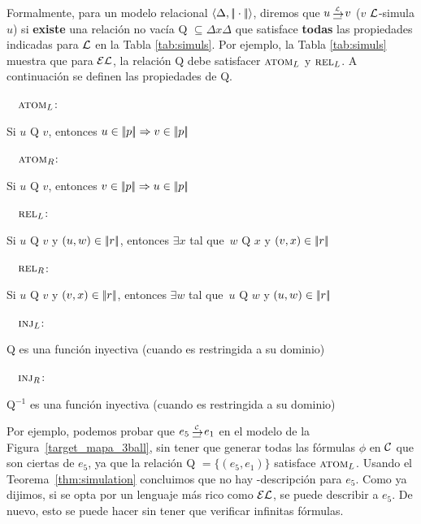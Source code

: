 Formalmente, para un modelo relacional $\langle \Delta, |\!|\cdot|\!| \rangle$, diremos que $u \simul{\+L} v$ ($v$ $\mathcal{L}$-simula $u$) si \textbf{existe} una relaci\'on no vac\'ia Q $\subseteq \Delta x \Delta$ que satisface \textbf{todas} las propiedades indicadas para $\mathcal{L}$ en la Tabla \ref{tab:simuls}. Por ejemplo, la Tabla \ref{tab:simuls} muestra que para $\mathcal{EL}$, la relaci\'on Q debe satisfacer $\textsc{atom}_L$ y $\textsc{rel}_L$. A continuaci\'on se definen las propiedades de Q.
\smallskip 

\newcommand{\simdef}[2]{\noindent\ \ #1\hfill:\ \parbox[t]{.87\textwidth}{#2}\par}

\simdef{$\textsc{atom}_L$}{Si $u$ Q $v$, entonces $u \in |\!|p|\!| \Rightarrow v \in |\!|p|\!|$}
\simdef{$\textsc{atom}_R$}{Si $u$ Q $v$, entonces $v \in |\!|p|\!| \Rightarrow u \in |\!|p|\!|$}
\simdef{$\textsc{rel}_L$}{Si $u$ Q $v$ y $(u,w) \in |\!|r|\!|$, entonces $\exists x$ tal que\ $w$ Q $x$
  y $(v,x) \in |\!|r|\!|$}
\simdef{$\textsc{rel}_R$}{Si $u$ Q $v$ y $(v,x) \in |\!|r|\!|$, entonces $\exists w$ tal que\ $u$ Q $w$ y
 $(u,w) \in |\!|r|\!|$}
\simdef{$\textsc{inj}_L\space$}{Q es una funci\'on inyectiva (cuando es restringida a su dominio)}
\simdef{$\textsc{inj}_R\space$}{Q$^{-1}$ es una funci\'on inyectiva (cuando es restringida a su dominio)}
\smallskip

Por ejemplo, podemos probar que $e_5 \simul{\+C} e_1$ en el modelo de la 
Figura~\ref{target_mapa_3ball}, sin tener que generar todas las f\'ormulas $\phi$ en $\mathcal{C}$ que son ciertas de $e_5$, ya que la relaci\'on Q $= \{(e_5,e_1) \}
$ satisface $\textsc{atom}_L$.
Usando el Teorema~\ref{thm:simulation} concluimos que no hay
 \CL-descripci\'on para $e_5$. Como ya dijimos, si se opta por un lenguaje m\'as rico como $\mathcal{EL}$, se puede describir a $e_5$. De nuevo, esto se puede hacer sin tener que verificar infinitas f\'ormulas.

